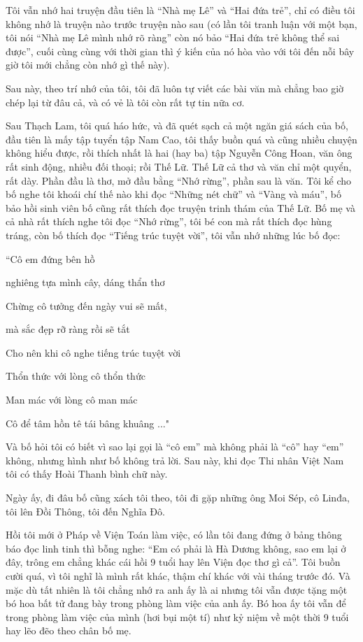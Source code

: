 Tôi vẫn nhớ hai truyện đầu tiên là “Nhà mẹ Lê” và “Hai đứa trẻ”, chỉ có điều tôi không nhớ là truyện nào trước truyện nào sau (có lần tôi tranh luận với một bạn, tôi nói “Nhà mẹ Lê mình nhớ rõ ràng” còn nó bảo “Hai đứa trẻ không thể sai được”, cuối cùng cùng với thời gian thì ý kiến của nó hòa vào với tôi đến nỗi bây giờ tôi mới chẳng còn nhớ gì thế này).

Sau này, theo trí nhớ của tôi, tôi đã luôn tự viết các bài văn mà chẳng bao giờ chép lại từ đâu cả, và có vẻ là tôi còn rất tự tin nữa cơ.

Sau Thạch Lam, tôi quá háo hức, và đã quét sạch cả một ngăn giá sách của bố, đầu tiên là mấy tập tuyển tập Nam Cao, tôi thấy buồn quá và cũng nhiều chuyện không hiểu được, rồi thích nhất là hai (hay ba) tập Nguyễn Công Hoan, văn ông rất sinh động, nhiều đối thoại; rồi Thế Lữ. Thế Lữ cả thơ và văn chỉ một quyển, rất dày. Phần đầu là thơ, mở đầu bằng “Nhớ rừng”, phần sau là văn. Tôi kể cho bố nghe tôi khoái chí thế nào khi đọc “Những nét chữ” và “Vàng và máu”, bố bảo hồi sinh viên bố cũng rất thích đọc truyện trinh thám của Thế Lữ. Bố mẹ và cả nhà rất thích nghe tôi đọc “Nhớ rừng”, tôi bé con mà rất thích đọc hùng tráng, còn bố thích đọc “Tiếng trúc tuyệt vời”, tôi vẫn nhớ những lúc bố đọc:

“Cô em đứng bên hồ

nghiêng tựa mình cây, dáng thẩn thơ

Chừng cô tưởng đến ngày vui sẽ mất,

mà sắc đẹp rỡ ràng rồi sẽ tắt

Cho nên khi cô nghe tiếng trúc tuyệt vời

Thổn thức với lòng cô thổn thức

Man mác với lòng cô man mác

Cô để tâm hồn tê tái bâng khuâng ..."

Và bố hỏi tôi có biết vì sao lại gọi là “cô em” mà không phải là “cô” hay “em” không, nhưng hình như bố không trả lời. Sau này, khi đọc Thi nhân Việt Nam tôi có thấy Hoài Thanh bình chữ này.

Ngày ấy, đi đâu bố cũng xách tôi theo, tôi đi gặp những ông Moi Sép, cô Linđa, tôi lên Đồi Thông, tôi đến Nghĩa Đô.

Hồi tôi mới ở Pháp về Viện Toán làm việc, có lần tôi đang đứng ở bảng thông báo đọc linh tinh thì bỗng nghe: “Em có phải là Hà Dương không, sao em lại ở đây, trông em chẳng khác cái hồi 9 tuổi hay lên Viện đọc thơ gì cả”. Tôi buồn cười quá, vì tôi nghĩ là mình rất khác, thậm chí khác với vài tháng trước đó. Và mặc dù tất nhiên là tôi chẳng nhớ ra anh ấy là ai nhưng tôi vẫn được tặng một bó hoa bất tử đang bày trong phòng làm việc của anh ấy. Bó hoa ấy tôi vẫn để trong phòng làm việc của mình (hơi bụi một tí) như kỷ niệm về một thời 9 tuổi hay lẽo đẽo theo chân bố mẹ.

